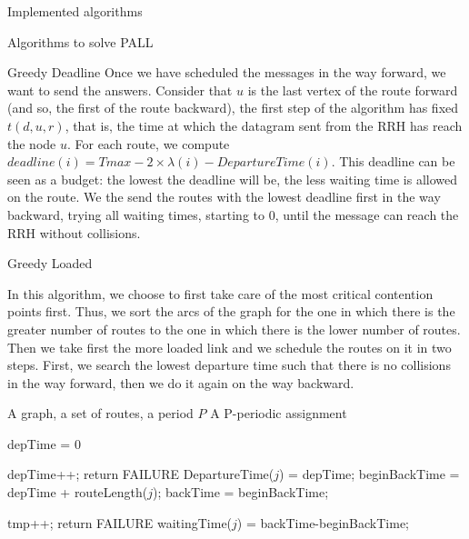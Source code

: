 \documentclass[10pt]{article}
\begin{document}
\begin{section}{Implemented algorithms}
\begin{subsection}{Algorithms to solve PALL}
\begin{subsubsection}{Greedy Deadline}
      Once we have scheduled the messages in the way forward, we want to send the answers. Consider that $u$ is the last vertex of the route forward (and so, the first of the route backward), the first step of the algorithm has fixed $t(d,u,r)$, that is, the time at which the datagram sent from the RRH has reach the node $u$. For each route, we compute $deadline(i) = Tmax - 2\times\lambda(i) - DepartureTime(i)$. This deadline can be seen as a budget: the lowest the deadline will be, the less waiting time is allowed on the route.\newline
      We the send the routes with the lowest deadline first in the way backward, trying all waiting times, starting to $0$, until the message can reach the RRH without collisions.
            
        \end{subsubsection}
    \begin{subsubsection}{Greedy Loaded}

In this algorithm, we choose to first take care of the most critical contention points first. Thus, we sort the arcs of the graph for the one in which there is the greater number of routes to the one in which there is the lower number of routes. Then we take first the more loaded link and we schedule the routes on it in two steps.
First, we search the lowest departure time such that there is no collisions in the way forward, then we do it again on the way backward. 

   	\begin{algorithm}[H]
 	\caption{Greedy Loaded}
 	\begin{algorithmic}
 	\REQUIRE A graph, a set of routes, a period $P$
	\ENSURE A P-periodic assignment

	
	\STATE depTime = $0$
	
 	
 	\STATE depTime++;
	\STATE return FAILURE
	\ENDIF
 	\ENDWHILE
	\STATE DepartureTime($j$) = depTime;
	\STATE beginBackTime = depTime + routeLength($j$);
	\STATE backTime = beginBackTime;
	
 	
 	\STATE tmp++;
	\STATE return FAILURE
	\ENDIF
 	\ENDWHILE
	\STATE waitingTime($j$) = backTime-beginBackTime;
	\ENDIF
 	\ENDFOR


\end{algorithmic}
\end{algorithm}
\end{subsubsection}
\end{subsection}
\end{section}
\end{document}
